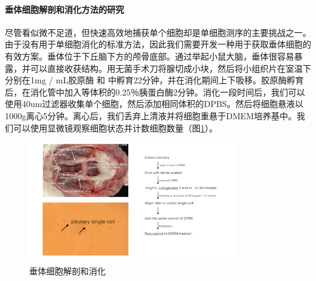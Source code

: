 \paragraph{垂体细胞解剖和消化方法的研究}
  尽管看似微不足道，但快速高效地捕获单个细胞却是单细胞测序的主要挑战之一。由于没有用于单细胞消化的标准方法，因此我们需要开发一种用于获取垂体细胞的有效方案。垂体位于下丘脑下方的颅骨底部。通过举起小鼠大脑，垂体很容易暴露，并可以直接收获结构。用无菌手术刀将腺切成小块，然后将小组织片在室温下分别在1mg / mL胶原酶 和 中孵育22分钟，并在消化期间上下吸移。胶原酶孵育后，在消化管中加入等体积的0.25％胰蛋白酶2分钟。消化一段时间后，我们可以使用40um过滤器收集单个细胞，然后添加相同体积的DPBS。然后将细胞悬液以1000g离心5分钟。离心后，我们丢弃上清液并将细胞重悬于DMEM培养基中。我们可以使用显微镜观察细胞状态并计数细胞数量（图\ref{fig:scseq-micro}）。
\begin{figure}[!htb]
  \centering
  \includegraphics[width=0.8\textwidth]{figs/scseq-micro.png}
  \caption{垂体细胞解剖和消化}
  \label{fig:scseq-micro}
\end{figure}
